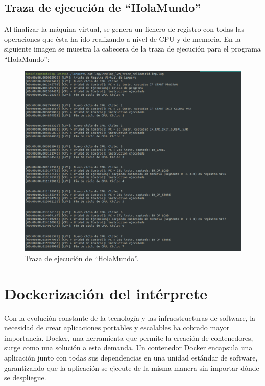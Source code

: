 \subsection{Traza de ejecución de ``HolaMundo''}
Al finalizar la máquina virtual, se genera un fichero de registro con todas las operaciones que ésta ha ido realizando a nivel de CPU y de memoria. En la siguiente imagen se muestra la cabecera de la traza de ejecución para el programa ``HolaMundo'':
\begin{figure}[h]
  \begin{minipage}{\linewidth}
    \centering
    \includegraphics[width=\linewidth]{images/implementacion/ejecucion/resumed_traza.png}
    \caption{Traza de ejecución de ``HolaMundo''.}
    \label{fig:trazaHolaMundo}
  \end{minipage}
\end{figure}

\newpage
\section{Dockerización del intérprete}
Con la evolución constante de la tecnología y las infraestructuras de software, la necesidad de crear aplicaciones portables y escalables ha cobrado mayor importancia. Docker, una herramienta que permite la creación de contenedores, surge como una solución a esta demanda. Un contenedor Docker encapsula una aplicación junto con todas sus dependencias en una unidad estándar de software, garantizando que la aplicación se ejecute de la misma manera sin importar dónde se despliegue. 



